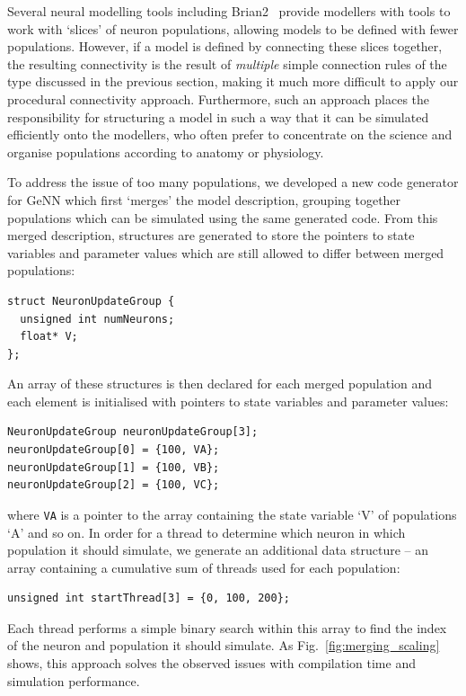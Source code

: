 \documentclass[9pt,twocolumn,twoside,lineno]{pnas-new}
\newcommand{\todo}[1]{\textbf{\textsc{\textcolor{red}{(TODO: #1)}}}}
\begin{document}
Several neural modelling tools including Brian2~\citep{Stimberg2014} provide modellers with tools to work with `slices' of neuron populations, allowing models to be defined with fewer populations.
However, if a model is defined by connecting these slices together, the resulting connectivity is the result of \emph{multiple} simple connection rules of the type discussed in the previous section, making it much more difficult to apply our procedural connectivity approach.
Furthermore, such an approach places the responsibility for structuring a model in such a way that it can be simulated efficiently onto the modellers, who often prefer to concentrate on the science and organise populations according to anatomy or physiology.

To address the issue of too many populations, we developed a new code generator for GeNN which first `merges' the model description, grouping together populations which can be simulated using the same generated code.
From this merged description, structures are generated to store the pointers to state variables and parameter values which are still allowed to differ between merged populations:
%
\begin{lstlisting}
struct NeuronUpdateGroup {
  unsigned int numNeurons;
  float* V;
};
\end{lstlisting}
%
An array of these structures is then declared for each merged population and each element is initialised with pointers to state variables and parameter values:
%
\begin{lstlisting}
NeuronUpdateGroup neuronUpdateGroup[3];
neuronUpdateGroup[0] = {100, VA};
neuronUpdateGroup[1] = {100, VB};
neuronUpdateGroup[2] = {100, VC};
\end{lstlisting}
%
where \lstinline{VA} is a pointer to the array containing the state variable `V' of populations `A' and so on.
In order for a thread to determine which neuron in which population it should simulate, we generate an additional data structure -- an array containing a cumulative sum of threads used for each population:
\begin{lstlisting}
unsigned int startThread[3] = {0, 100, 200};
\end{lstlisting}
Each thread performs a simple binary search within this array to find the index of the neuron and population it should simulate.
As Fig.~\ref{fig:merging_scaling} shows, this approach solves the observed issues with compilation time and simulation performance.
%
\end{document}

